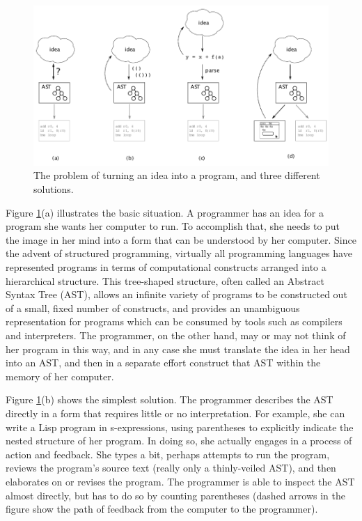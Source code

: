 \begin{figure}[h]
  \centering
  
  \includegraphics{src/image/figure1.pdf}

  \caption{The problem of turning an idea into a program, and three different solutions.}
  \label{fig-1}
\end{figure}

Figure \ref{fig-1}(a) illustrates the basic situation. A programmer has an idea for a program she wants her computer to run. To accomplish that, she needs to put the image in her mind into a form that can be understood by her computer. Since the advent of structured programming, virtually all programming languages have represented programs in terms of computational constructs arranged into a hierarchical structure. This tree-shaped structure, often called an Abstract Syntax Tree (AST), allows an infinite variety of programs to be constructed out of a small, fixed number of constructs, and provides an unambiguous representation for programs which can be consumed by tools such as compilers and interpreters. The programmer, on the other hand, may or may not think of her program in this way, and in any case she must translate the idea in her head into an AST, and then in a separate effort construct that AST within the memory of her computer.

Figure \ref{fig-1}(b) shows the simplest solution. The programmer describes the AST directly in a form that requires little or no interpretation. For example, she can write a Lisp program in s-expressions, using parentheses to explicitly indicate the nested structure of her program. In doing so, she actually engages in a process of action and feedback. She types a bit, perhaps attempts to run the program, reviews the program's source text (really only a thinly-veiled AST), and then elaborates on or revises the program. The programmer is able to inspect the AST almost directly, but has to do so by counting parentheses (dashed arrows in the figure show the path of feedback from the computer to the programmer).

